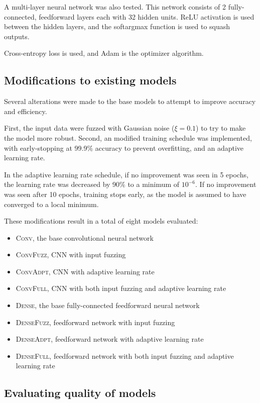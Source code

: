 \documentclass{article}
\begin{document}
A multi-layer neural network was also tested.
This network consists of 2 fully-connected, feedforward layers each with 32 hidden units.
ReLU activation is used between the hidden layers,
and the softargmax function is used to squash outputs.

Cross-entropy loss is used, and Adam is the optimizer algorithm.

\subsection{Modifications to existing models}

Several alterations were made to the base models to attempt to improve accuracy and efficiency.

First, the input data were fuzzed with Gaussian noise ($\xi = 0.1$)
to try to make the model more robust.
Second, an modified training schedule was implemented,
with early-stopping at 99.9\% accuracy to prevent overfitting,
and an adaptive learning rate.

In the adaptive learning rate schedule,
if no improvement was seen in 5 epochs, the learning rate was decreased by 90\%
to a minimum of $10^{-6}$.
If no improvement was seen after 10 epochs, training stops early,
as the model is assumed to have converged to a local minimum.

These modifications result in a total of eight models evaluated:

\begin{itemize}
  \item \textsc{Conv}, the base convolutional neural network
  \item \textsc{ConvFuzz}, CNN with input fuzzing
  \item \textsc{ConvAdpt}, CNN with adaptive learning rate
  \item \textsc{ConvFull}, CNN with both input fuzzing and adaptive learning rate
  \item \textsc{Dense}, the base fully-connected feedforward neural network
  \item \textsc{DenseFuzz}, feedforward network with input fuzzing
  \item \textsc{DenseAdpt}, feedforward network with adaptive learning rate
  \item \textsc{DenseFull}, feedforward network with both input fuzzing and adaptive learning rate
\end{itemize}

\subsection{Evaluating quality of models}
\end{document}
